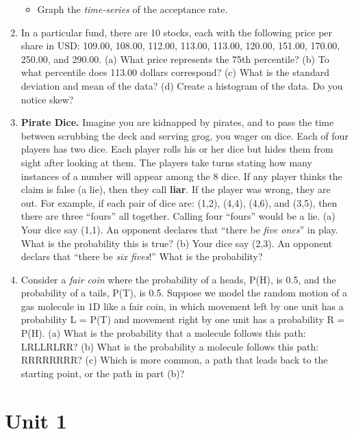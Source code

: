 \documentclass{article}
\begin{document}
\begin{enumerate}
\begin{itemize}
\item Graph the \textit{time-series} of the acceptance rate.
\end{itemize}
\vspace{5cm}
\item In a particular fund, there are 10 stocks, each with the following price per share in USD: 109.00, 108.00, 112.00, 113.00, 113.00, 120.00, 151.00, 170.00, 250.00, and 290.00.  (a) What price represents the 75th percentile? (b) To what percentile does 113.00 dollars correspond? (c) What is the standard deviation and mean of the data? (d) Create a histogram of the data.  Do you notice skew? \\ \vspace{3cm}
\item \textbf{Pirate Dice.} Imagine you are kidnapped by pirates, and to pass the time between scrubbing the deck and serving grog, you wager on dice.  Each of four players has two dice.  Each player rolls his or her dice but hides them from sight after looking at them.  The players take turns stating how many instances of a number will appear among the 8 dice. If any player thinks the claim is false (a lie), then they call \textbf{liar}.  If the player was wrong, they are out. For example, if each pair of dice are: (1,2), (4,4), (4,6), and (3,5), then there are three ``fours'' all together.  Calling four ``fours'' would be a lie.  (a) Your dice say (1,1).  An opponent declares that ``there be \textit{five ones}'' in play.  What is the probability this is true? (b) Your dice say (2,3).  An opponent declars that ``there be \textit{six fives}!'' What is the probability? \\ \vspace{3cm}
\item Consider a \textit{fair coin} where the probability of a heads, P(H), is 0.5, and the probability of a tails, P(T), is 0.5.  Suppose we model the random motion of a gas molecule in 1D like a fair coin, in which movement left by one unit has a probability L = P(T) and movement right by one unit has a probability R = P(H).  (a) What is the probability that a molecule follows this path: LRLLRLRR? (b) What is the probability a molecule follows this path: RRRRRRRR? (c) Which is more common, a path that leads back to the starting point, or the path in part (b)? \\ \vspace{2cm}
\end{enumerate}

\section{Unit 1}
\end{document}

